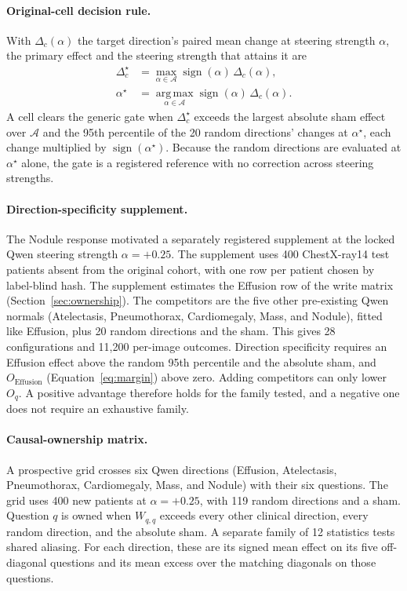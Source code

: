 \paragraph{Original-cell decision rule.}
With $\Delta_c(\alpha)$ the target direction's paired mean change at steering strength $\alpha$, the primary effect and the steering strength that attains it are
\begin{equation}
\begin{aligned}
\Delta^\star_c&=\max_{\alpha\in\mathcal A}\operatorname{sign}(\alpha)\,\Delta_c(\alpha),\\
\alpha^\star&=\operatorname*{arg\,max}_{\alpha\in\mathcal A}\operatorname{sign}(\alpha)\,\Delta_c(\alpha).
\end{aligned}
\label{eq:seed-rule}
\end{equation}
A cell clears the generic gate when $\Delta^\star_c$ exceeds the largest absolute sham effect over $\mathcal A$ and the 95th percentile of the 20 random directions' changes at $\alpha^\star$, each change multiplied by $\operatorname{sign}(\alpha^\star)$. Because the random directions are evaluated at $\alpha^\star$ alone, the gate is a registered reference with no correction across steering strengths.

\paragraph{Direction-specificity supplement.}
The Nodule response motivated a separately registered supplement at the locked Qwen steering strength $\alpha=+0.25$. The supplement uses 400 ChestX-ray14 test patients absent from the original cohort, with one row per patient chosen by label-blind hash. The supplement estimates the Effusion row of the write matrix (Section~\ref{sec:ownership}). The competitors are the five other pre-existing Qwen normals (Atelectasis, Pneumothorax, Cardiomegaly, Mass, and Nodule), fitted like Effusion, plus 20 random directions and the sham. This gives 28 configurations and 11,200 per-image outcomes. Direction specificity requires an Effusion effect above the random 95th percentile and the absolute sham, and $O_{\mathrm{Effusion}}$ (Equation~\ref{eq:margin}) above zero. Adding competitors can only lower $O_q$. A positive advantage therefore holds for the family tested, and a negative one does not require an exhaustive family.

\paragraph{Causal-ownership matrix.}
A prospective grid crosses six Qwen directions (Effusion, Atelectasis, Pneumothorax, Cardiomegaly, Mass, and Nodule) with their six questions. The grid uses 400 new patients at $\alpha=+0.25$, with 119 random directions and a sham. Question $q$ is owned when $W_{q,q}$ exceeds every other clinical direction, every random direction, and the absolute sham. A separate family of 12 statistics tests shared aliasing. For each direction, these are its signed mean effect on its five off-diagonal questions and its mean excess over the matching diagonals on those questions.

